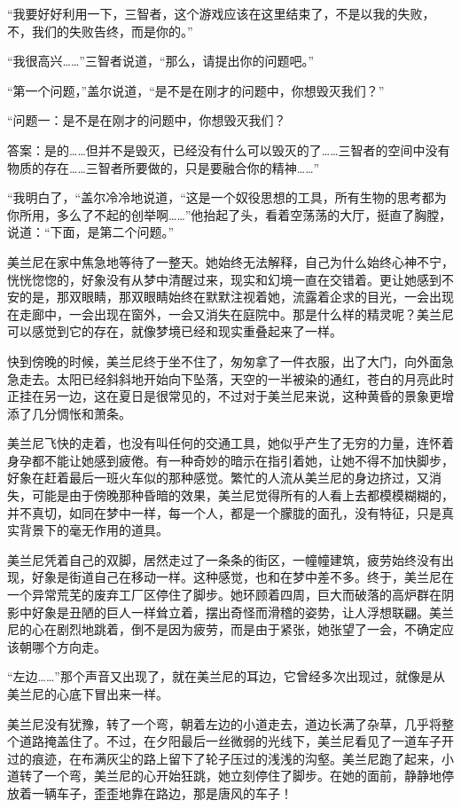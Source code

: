 “我要好好利用一下，三智者，这个游戏应该在这里结束了，不是以我的失败，不，我们的失败告终，而是你的。” 

“我很高兴……”三智者说道，“那么，请提出你的问题吧。” 

“第一个问题，”盖尔说道，“是不是在刚才的问题中，你想毁灭我们？” 

“问题一：是不是在刚才的问题中，你想毁灭我们？ 

答案：是的……但并不是毁灭，已经没有什么可以毁灭的了……三智者的空间中没有物质的存在……三智者所要做的，只是要融合你的精神……” 

“我明白了，“盖尔冷冷地说道，“这是一个奴役思想的工具，所有生物的思考都为你所用，多么了不起的创举啊……”他抬起了头，看着空荡荡的大厅，挺直了胸膛，说道：“下面，是第二个问题。” 

美兰尼在家中焦急地等待了一整天。她始终无法解释，自己为什么始终心神不宁，恍恍惚惚的，好象没有从梦中清醒过来，现实和幻境一直在交错着。更让她感到不安的是，那双眼睛，那双眼睛始终在默默注视着她，流露着企求的目光，一会出现在走廊中，一会出现在窗外，一会又消失在庭院中。那是什么样的精灵呢？美兰尼可以感觉到它的存在，就像梦境已经和现实重叠起来了一样。 

快到傍晚的时候，美兰尼终于坐不住了，匆匆拿了一件衣服，出了大门，向外面急急走去。太阳已经斜斜地开始向下坠落，天空的一半被染的通红，苍白的月亮此时正挂在另一边，这在夏日是很常见的，不过对于美兰尼来说，这种黄昏的景象更增添了几分惆怅和萧条。 

美兰尼飞快的走着，也没有叫任何的交通工具，她似乎产生了无穷的力量，连怀着身孕都不能让她感到疲倦。有一种奇妙的暗示在指引着她，让她不得不加快脚步，好象在赶着最后一班火车似的那种感觉。繁忙的人流从美兰尼的身边挤过，又消失，可能是由于傍晚那种昏暗的效果，美兰尼觉得所有的人看上去都模模糊糊的，并不真切，如同在梦中一样，每一个人，都是一个朦胧的面孔，没有特征，只是真实背景下的毫无作用的道具。 

美兰尼凭着自己的双脚，居然走过了一条条的街区，一幢幢建筑，疲劳始终没有出现，好象是街道自己在移动一样。这种感觉，也和在梦中差不多。终于，美兰尼在一个异常荒芜的废弃工厂区停住了脚步。她环顾着四周，巨大而破落的高炉群在阴影中好象是丑陋的巨人一样耸立着，摆出奇怪而滑稽的姿势，让人浮想联翩。美兰尼的心在剧烈地跳着，倒不是因为疲劳，而是由于紧张，她张望了一会，不确定应该朝哪个方向走。 

“左边……”那个声音又出现了，就在美兰尼的耳边，它曾经多次出现过，就像是从美兰尼的心底下冒出来一样。 

美兰尼没有犹豫，转了一个弯，朝着左边的小道走去，道边长满了杂草，几乎将整个道路掩盖住了。不过，在夕阳最后一丝微弱的光线下，美兰尼看见了一道车子开过的痕迹，在布满灰尘的路上留下了轮子压过的浅浅的沟壑。美兰尼跑了起来，小道转了一个弯，美兰尼的心开始狂跳，她立刻停住了脚步。在她的面前，静静地停放着一辆车子，歪歪地靠在路边，那是唐风的车子！ 


